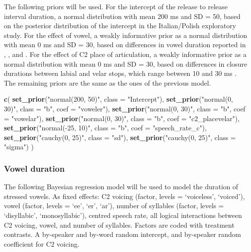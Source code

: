 \documentclass[11pt,]{article}
\newenvironment{Shaded}{\begin{snugshade}}{\end{snugshade}}
\newcommand{\DataTypeTok}[1]{\textcolor[rgb]{0.13,0.29,0.53}{#1}}
\newcommand{\KeywordTok}[1]{\textcolor[rgb]{0.13,0.29,0.53}{\textbf{#1}}}
\newcommand{\NormalTok}[1]{#1}
\newcommand{\StringTok}[1]{\textcolor[rgb]{0.31,0.60,0.02}{#1}}
\begin{document}
The following priors will be used. For the intercept of the release to
release interval duration, a normal distribution with mean 200 ms and SD
= 50, based on the posterior distribution of the intercept in the
Italian/Polish exploratory study. For the effect of vowel, a weakly
informative prior as a normal distribution with mean 0 ms and SD = 30,
based on differences in vowel duration reported in \citet{heffner1937},
\citet{house1953}, and \citet{hertrich1997}. For the effect of C2 place
of articulation, a weakly informative prior as a normal distribution
with mean 0 ms and SD = 30, based on differences in closure durations
between labial and velar stops, which range between 10 and 30 ms
\citep{sharf1962}. The remaining priors are the same as the ones of the
previous model.

\begin{Shaded}
\begin{Highlighting}[]
\KeywordTok{c}\NormalTok{(}
  \KeywordTok{set_prior}\NormalTok{(}\StringTok{"normal(200, 50)"}\NormalTok{, }\DataTypeTok{class =} \StringTok{"Intercept"}\NormalTok{),}
  \KeywordTok{set_prior}\NormalTok{(}\StringTok{"normal(0, 30)"}\NormalTok{, }\DataTypeTok{class =} \StringTok{"b"}\NormalTok{, }\DataTypeTok{coef =} \StringTok{"voweler"}\NormalTok{),}
  \KeywordTok{set_prior}\NormalTok{(}\StringTok{"normal(0, 30)"}\NormalTok{, }\DataTypeTok{class =} \StringTok{"b"}\NormalTok{, }\DataTypeTok{coef =} \StringTok{"vowelar"}\NormalTok{),}
  \KeywordTok{set_prior}\NormalTok{(}\StringTok{"normal(0, 30)"}\NormalTok{, }\DataTypeTok{class =} \StringTok{"b"}\NormalTok{, }\DataTypeTok{coef =} \StringTok{"c2_placevelar"}\NormalTok{),}
  \KeywordTok{set_prior}\NormalTok{(}\StringTok{"normal(-25, 10)"}\NormalTok{, }\DataTypeTok{class =} \StringTok{"b"}\NormalTok{, }\DataTypeTok{coef =} \StringTok{"speech_rate_c"}\NormalTok{),}
  \KeywordTok{set_prior}\NormalTok{(}\StringTok{"cauchy(0, 25)"}\NormalTok{, }\DataTypeTok{class =} \StringTok{"sd"}\NormalTok{),}
  \KeywordTok{set_prior}\NormalTok{(}\StringTok{"cauchy(0, 25)"}\NormalTok{, }\DataTypeTok{class =} \StringTok{"sigma"}\NormalTok{)}
\NormalTok{)}
\end{Highlighting}
\end{Shaded}

\hypertarget{vowel-duration}{%
\subsubsection{Vowel duration}\label{vowel-duration}}

The following Bayesian regression model will be used to model the
duration of stressed vowels. As fixed effects: C2 voicing (factor,
levels = `voiceless', `voiced'), vowel (factor, levels = `ee', `er',
`ar'), number of syllables (factor, levels = `disyllabic',
`monosyllabic'), centred speech rate, all logical interactions between
C2 voicing, vowel, and number of syllables. Factors are coded with
treatment contrasts. A by-speaker and by-word random intercept, and
by-speaker random coefficient for C2 voicing.
\end{document}
